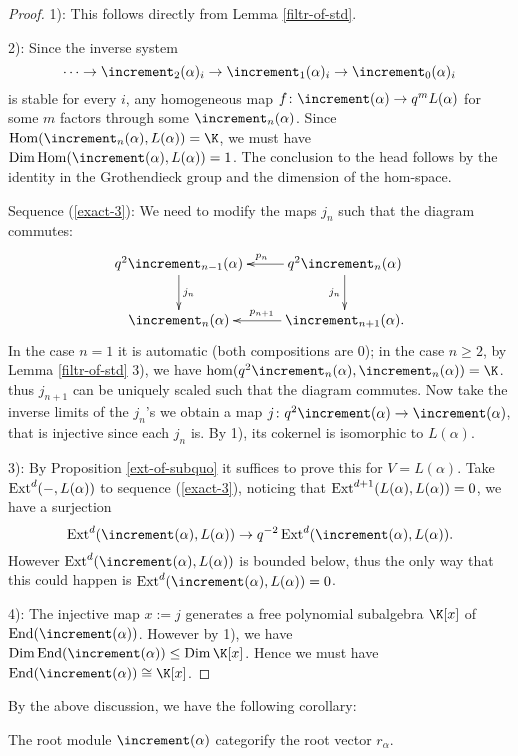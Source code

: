 \begin{proof}
    1): This follows directly from Lemma \ref{filtr-of-std}.

    2): Since the inverse system $$\cdots\to
    \std_2(\alpha)_i\to\std_1(\alpha)_i\to\std_0(\alpha)_i$$
    is stable for every $i$, any homogeneous map $f\:\std(\alpha)
    \to q^mL(\alpha)$ for some $m$ factors through some $\std_n(\alpha)$.
    Since $\Hom(\std_n(\alpha),L(\alpha)) = \K$, we must have
    $\Dim\Hom(\std(\alpha),L(\alpha)) = 1$. The conclusion to the head
    follows by the identity in the Grothendieck group and the dimension
    of the hom-space.

    Sequence (\ref{exact-3}): We need to modify the maps $j_n$ such that the
    diagram commutes:
    \[
        \xymatrix{
            q^2\std_{n-1}(\alpha)\ar[d]^{j_n}&q^2\std_n(\alpha)\ar[l]_{p_n}\ar[d]_{j_n}\\
            \std_n(\alpha)&\std_{n+1}(\alpha)\ar[l]_{p_{n+1}}.
        }
    \] 
    In the case $n = 1$ it is automatic (both compositions are $0$);
    in the case $n\ge 2$, by Lemma \ref{filtr-of-std} 3), we have $\hom(q^2\std_n(\alpha),
    \std_n(\alpha)) = \K$. thus $j_{n+1}$
    can be uniquely scaled such that the diagram commutes. Now take the inverse
    limits of the $j_n$'s we obtain a map $j\:q^2\std(\alpha)\to\std(\alpha)$,
    that is injective since each $j_n$ is. By 1), its cokernel
    is isomorphic to $L(\alpha)$.

    3): By Proposition \ref{ext-of-subquo} it suffices to prove this
    for $V = L(\alpha)$. Take $\operatorname{Ext}^d(-,L(\alpha))$ to sequence
    (\ref{exact-3}), noticing that $\operatorname{Ext}^{d+1}(L(\alpha),L(\alpha)) = 0$,
    we have a surjection 
    \[
        \Ext^d(\std(\alpha),L(\alpha))\to
        q^{-2}\Ext^d(\std(\alpha),L(\alpha)).
    \] 
    However $\Ext^d(\std(\alpha),L(\alpha))$
    is bounded below, thus the only way that this could happen is
    $\Ext^d(\std(\alpha),L(\alpha)) = 0$.

    4): The injective map $x := j$ generates a free polynomial subalgebra
    $\K[x]$ of $\End(\std(\alpha))$. However by 1),
    we have $\Dim\End(\std(\alpha))\le\Dim\K[x]$. Hence we must have
    $\End(\std(\alpha))\cong\K[x]$.
\end{proof}

By the above discussion, we have the following corollary:

\begin{corollary}
    The root module $\std(\alpha)$ categorify the root vector $r_\alpha$.
\end{corollary}

